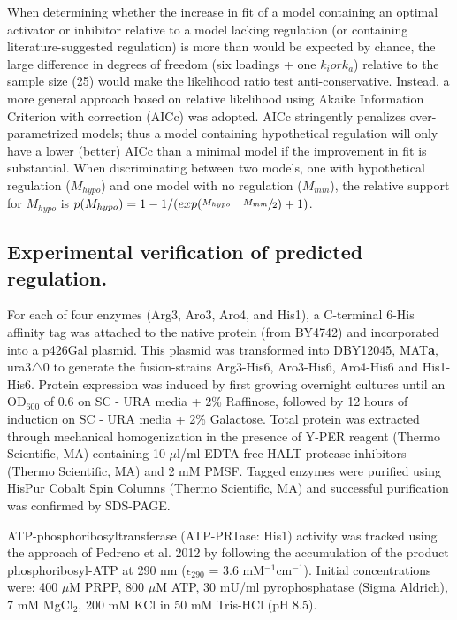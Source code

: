 When determining whether the increase in fit of a model containing an optimal activator or inhibitor relative to a model lacking regulation (or containing literature-suggested regulation) is more than would be expected by chance, the large difference in degrees of freedom (six loadings + one $k_{i} or k_{a}$) relative to the sample size (25) would make the likelihood ratio test anti-conservative.  Instead, a more general approach based on relative likelihood using Akaike Information Criterion with correction (AICc) was adopted.  AICc stringently penalizes over-parametrized models; thus a model containing hypothetical regulation will only have a lower (better) AICc than a minimal model if the improvement in fit is substantial.  When discriminating between two models, one with hypothetical regulation ($M_{hypo}$) and one model with no regulation ($M_{mm}$), the relative support for $M_{hypo}$ is $p(M_{hypo}) = 1 - 1/(exp(\sfrac{M_{hypo} - M_{mm}}{2}) + 1)$.

\subsection*{Experimental verification of predicted regulation.}

For each of four enzymes (Arg3, Aro3, Aro4, and His1), a C-terminal 6-His affinity tag was attached to the native protein (from BY4742) and incorporated into a p426Gal plasmid.  This plasmid was transformed into DBY12045, MAT\textbf{a}, ura3$\bigtriangleup$0 to generate the fusion-strains Arg3-His6, Aro3-His6, Aro4-His6 and His1-His6.  Protein expression was induced by first growing overnight cultures until an OD$_{600}$ of 0.6 on SC - URA media + 2\% Raffinose, followed by 12 hours of induction on SC - URA media + 2\% Galactose.  Total protein was extracted through mechanical homogenization in the presence of Y-PER reagent (Thermo Scientific, MA) containing 10 $\mu$l/ml EDTA-free HALT protease inhibitors (Thermo Scientific, MA) and 2 mM PMSF.  Tagged enzymes were purified using HisPur Cobalt Spin Columns (Thermo Scientific, MA) and successful purification was confirmed by SDS-PAGE.

ATP-phosphoribosyltransferase (ATP-PRTase: His1) activity was tracked using the approach of Pedreno et al. 2012 \cite{Pedreno:2012hv} by following the accumulation of the product phosphoribosyl-ATP at 290 nm ($\epsilon_{290}$ = 3.6 mM$^{-1}$cm$^{-1}$).  Initial concentrations were: 400 $\mu$M PRPP, 800 $\mu$M ATP, 30 mU/ml pyrophosphatase (Sigma Aldrich), 7 mM MgCl$_{2}$, 200 mM KCl in 50 mM Tris-HCl (pH 8.5).

